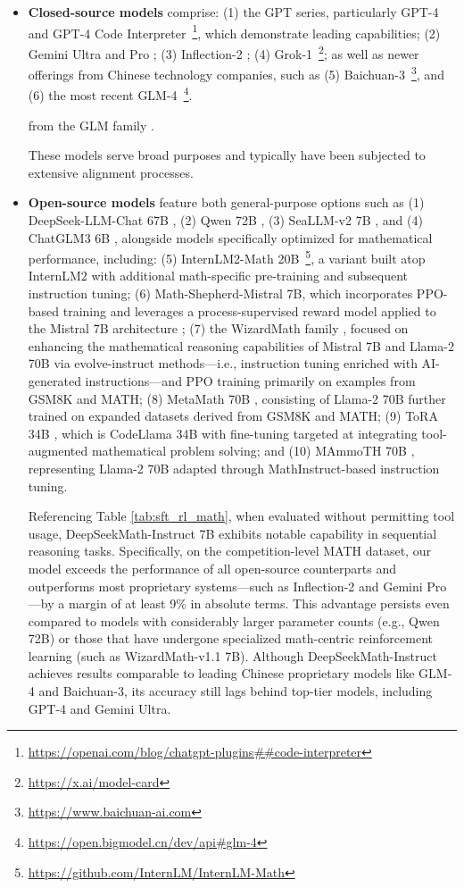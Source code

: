 \begin{itemize}[topsep=0pt]
\begin{itemize}[topsep=0pt]
    \item \textbf{Closed-source models} comprise: (1) the GPT series, particularly GPT-4 \citep{gpt4} and GPT-4 Code Interpreter~\footnote{\url{https://openai.com/blog/chatgpt-plugins\#\#code-interpreter}}, which demonstrate leading capabilities; (2) Gemini Ultra and Pro \citep{gemini}; (3) Inflection-2 \citep{inflection-2}; (4) Grok-1~\footnote{\url{https://x.ai/model-card}}; as well as newer offerings from Chinese technology companies, such as (5) Baichuan-3~\footnote{\url{https://www.baichuan-ai.com}}, and (6) the most recent GLM-4~\footnote{\url{https://open.bigmodel.cn/dev/api\#glm-4}}.

    from the GLM family \citep{glm}.

These models serve broad purposes and typically have been subjected to extensive alignment processes.

\item \textbf{Open-source models} feature both general-purpose options such as (1) DeepSeek-LLM-Chat 67B \citep{deepseek-llm}, (2) Qwen 72B \citep{qwen}, (3) SeaLLM-v2 7B \citep{seallm}, and (4) ChatGLM3 6B \citep{chatglm3}, alongside models specifically optimized for mathematical performance, including: (5) InternLM2-Math 20B~\footnote{\url{https://github.com/InternLM/InternLM-Math}}, a variant built atop InternLM2 with additional math-specific pre-training and subsequent instruction tuning; (6) Math-Shepherd-Mistral 7B, which incorporates PPO-based training \citep{schulman2017proximal} and leverages a process-supervised reward model applied to the Mistral 7B architecture \citep{mistral}; (7) the WizardMath family \citep{wizardmath}, focused on enhancing the mathematical reasoning capabilities of Mistral 7B and Llama-2 70B \citep{llama2} via evolve-instruct methods—i.e., instruction tuning enriched with AI-generated instructions—and PPO training primarily on examples from GSM8K and MATH; (8) MetaMath 70B \citep{metamath}, consisting of Llama-2 70B further trained on expanded datasets derived from GSM8K and MATH; (9) ToRA 34B \cite{tora}, which is CodeLlama 34B with fine-tuning targeted at integrating tool-augmented mathematical problem solving; and (10) MAmmoTH 70B \citep{MathInstruct}, representing Llama-2 70B adapted through MathInstruct-based instruction tuning.

Referencing Table \ref{tab:sft_rl_math}, when evaluated without permitting tool usage, DeepSeekMath-Instruct 7B exhibits notable capability in sequential reasoning tasks. Specifically, on the competition-level MATH dataset, our model exceeds the performance of all open-source counterparts and outperforms most proprietary systems—such as Inflection-2 and Gemini Pro—by a margin of at least 9\% in absolute terms. This advantage persists even compared to models with considerably larger parameter counts (e.g., Qwen 72B) or those that have undergone specialized math-centric reinforcement learning (such as WizardMath-v1.1 7B). Although DeepSeekMath-Instruct achieves results comparable to leading Chinese proprietary models like GLM-4 and Baichuan-3, its accuracy still lags behind top-tier models, including GPT-4 and Gemini Ultra.


\end{itemize}
\end{itemize}
